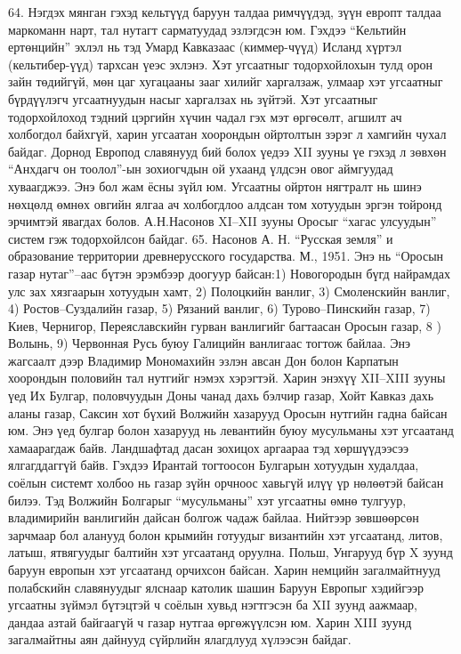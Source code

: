 64. Нэгдэх мянган гэхэд кельтүүд баруун талдаа римчүүдэд, зүүн европт талдаа маркоманн нарт, тал нутагт сарматуудад эзлэгдсэн юм. Гэхдээ “Кельтийн ертөнцийн” эхлэл нь тэд Умард Кавказаас (киммер-чүүд) Исланд хүртэл (кельтибер-үүд) тархсан үеэс эхлэнэ. Хэт угсаатныг тодорхойлохын тулд орон зайн төдийгүй, мөн цаг хугацааны зааг хилийг харгалзаж, улмаар хэт угсаатныг бүрдүүлэгч угсаатнуудын насыг харгалзах нь зүйтэй. Хэт угсаатныг тодорхойлоход тэдний цэргийн хүчин чадал гэх мэт өргөсөлт, агшилт ач холбогдол байхгүй, харин угсаатан хоорондын ойртолтын зэрэг л хамгийн чухал байдаг.
Дорнод Европод славянууд бий болох үедээ XII зууны үе гэхэд л зөвхөн “Анхдагч он тоолол”-ын зохиогчдын ой ухаанд үлдсэн овог аймгуудад хуваагджээ. Энэ бол жам ёсны зүйл юм. Угсаатны ойртон нягтралт нь шинэ нөхцөлд өмнөх овгийн ялгаа ач холбогдлоо алдсан том хотуудын эргэн тойронд эрчимтэй явагдах болов. А.Н.Насонов XI–XII зууны Оросыг “хагас улсуудын” систем гэж тодорхойлсон байдаг. 65. Насонов А. Н. “Русская земля” и образование территории древнерусского государства. М., 1951.
Энэ нь “Оросын газар нутаг”–аас бүтэн эрэмбээр доогуур байсан:1) Новогородын бүгд найрамдах улс зах хязгаарын хотуудын хамт, 2) Полоцкийн ванлиг, 3) Смоленскийн ванлиг, 4) Ростов–Суздалийн газар, 5) Рязаний ванлиг, 6) Турово–Пинскийн газар, 7) Киев, Чернигор, Переяславскийн гурван ванлигийг багтаасан Оросын газар, 8 ) Волынь, 9) Червонная Русь буюу Галицийн ванлигаас тогтож байлаа. Энэ жагсаалт дээр Владимир Мономахийн эзлэн авсан Дон болон Карпатын хоорондын половийн тал нутгийг нэмэх хэрэгтэй. Харин энэхүү XII–XIII зууны үед Их Булгар, половчуудын Доны чанад дахь бэлчир газар, Хойт Кавказ дахь аланы газар, Саксин хот бүхий Волжийн хазарууд Оросын нутгийн гадна байсан юм.
Энэ үед булгар болон хазарууд нь левантийн буюу мусульманы хэт угсаатанд хамаарагдаж байв. Ландшафтад дасан зохицох аргаараа тэд хөршүүдээсээ ялгагддаггүй байв. Гэхдээ Ирантай тогтоосон Булгарын хотуудын худалдаа, соёлын системт холбоо нь газар зүйн орчноос хавьгүй илүү үр нөлөөтэй байсан билээ. Тэд Волжийн Болгарыг “мусульманы” хэт угсаатны өмнө тулгуур, владимирийн ванлигийн дайсан болгож чадаж байлаа.
Нийтээр зөвшөөрсөн зарчмаар бол аланууд болон крымийн готуудыг византийн хэт угсаатанд, литов, латыш, ятвягуудыг балтийн хэт угсаатанд оруулна. Польш, Унгарууд бүр X зуунд баруун европын хэт угсаатанд орчихсон байсан. Харин немцийн загалмайтнууд полабскийн славянуудыг ялснаар католик шашин Баруун Европыг хэдийгээр угсаатны зүймэл бүтэцтэй ч соёлын хувьд нэгтгэсэн ба XII зуунд аажмаар, дандаа азтай байгаагүй ч газар нутгаа өргөжүүлсэн юм. Харин XIII зуунд загалмайтны аян дайнууд сүйрлийн ялагдлууд хүлээсэн байдаг.
